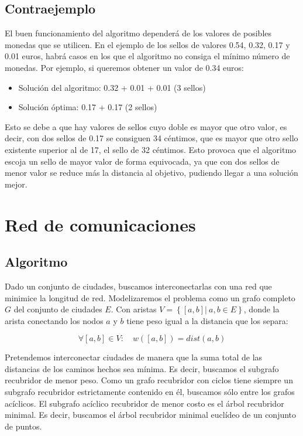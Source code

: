 \documentclass[a4paper, 11pt]{article} %
\begin{document}
\subsection{Contraejemplo}
El buen funcionamiento del algoritmo dependerá de los valores de posibles monedas que se utilicen.
En el ejemplo de los sellos de valores 0.54, 0.32, 0.17 y 0.01 euros, habrá casos en los que el 
algoritmo no consiga el mínimo número de monedas. Por ejemplo, si queremos obtener un valor de 0.34 euros:
\begin{itemize}
	\item Solución del algoritmo: 0.32 + 0.01 + 0.01 (3 sellos)
	\item Solución óptima: 0.17 + 0.17 (2 sellos)
\end{itemize}

Esto se debe a que hay valores de sellos cuyo doble es mayor que otro valor, es decir, con dos sellos de 0.17 se consiguen 34 céntimos, 
que es mayor que otro sello existente superior al de 17, el sello de 32 céntimos. Esto provoca que el algoritmo escoja un sello de mayor 
valor de forma equivocada, ya que con dos sellos de menor valor se reduce más la distancia al objetivo, pudiendo llegar a una solución mejor.


\section{Red de comunicaciones}
  \subsection{Algoritmo}
    Dado un conjunto de ciudades, buscamos interconectarlas con una red que minimice la longitud de red. 
    Modelizaremos el problema como un grafo completo $G$ del conjunto de ciudades $E$. Con aristas 
    $V = \left\{ [a,b] |\ a,b \in E \right\}$, donde la arista conectando los nodos $a$ y $b$ tiene peso 
    igual a la distancia que los separa:

    \begin{equation}
     \forall [a,b]\in V:\quad  w([a,b]) = dist (a,b)
    \end{equation}

    Pretendemos interconectar ciudades de manera que la suma total de las distancias de los caminos hechos 
    sea mínima. Es decir, buscamos el subgrafo recubridor de menor peso. Como un grafo recubridor con ciclos 
    tiene siempre un subgrafo recubridor estrictamente contenido en él, buscamos sólo entre los grafos acíclicos.
    El subgrafo acíclico recubridor de menor costo es el árbol recubridor minimal. Es decir, buscamos el árbol
    recubridor minimal euclídeo de un conjunto de puntos.
    
\end{document}

